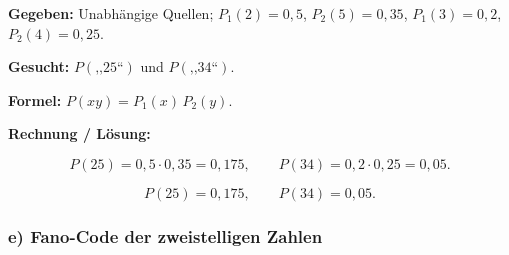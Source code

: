 \begin{beispiel}

\textbf{Gegeben:} Unabhängige Quellen; $P_1(2) = 0{,}5$, $P_2(5) = 0{,}35$,
$P_1(3) = 0{,}2$, $P_2(4) = 0{,}25$.

\textbf{Gesucht:} $P(\text{,,}25\text{``})$ und $P(\text{,,}34\text{``})$.

\textbf{Formel:} $P(xy) = P_1(x)\,P_2(y)$.

\textbf{Rechnung / Lösung:}

$$
P(25) = 0{,}5\cdot 0{,}35 = 0{,}175, \qquad
P(34) = 0{,}2\cdot 0{,}25 = 0{,}05.
$$

$$
\boxed{\;P(25) = 0{,}175, \qquad P(34) = 0{,}05.\;}
$$

\end{beispiel}

\subsubsection*{e) Fano-Code der zweistelligen Zahlen}

